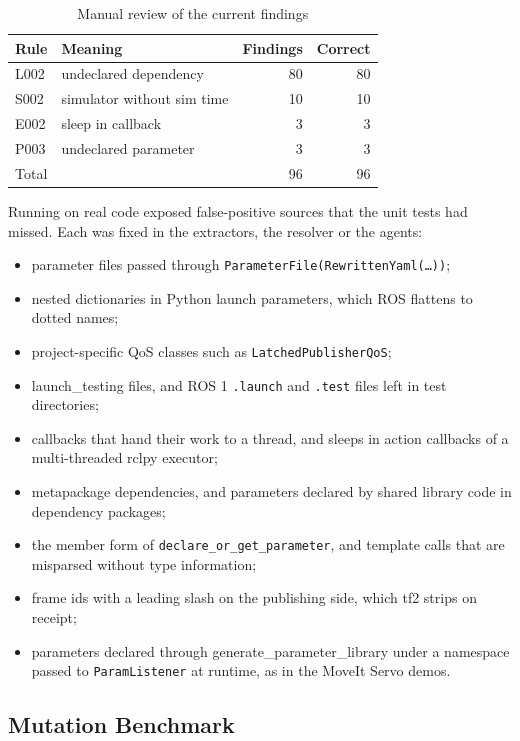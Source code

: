 \documentclass[conference]{IEEEtran}
\newcommand{\code}[1]{\texttt{#1}}
\begin{document}
\begin{table}[t]
\centering
\caption{Manual review of the current findings}
\label{tab:precision}
\footnotesize
\begin{tabular}{@{}llrr@{}}
\toprule
Rule & Meaning & Findings & Correct\\
\midrule
L002 & undeclared dependency       & 80 & 80\\
S002 & simulator without sim time  & 10 & 10\\
E002 & sleep in callback           &  3 &  3\\
P003 & undeclared parameter        &  3 &  3\\
\midrule
Total &                            & 96 & 96\\
\bottomrule
\end{tabular}
\end{table}

Running on real code exposed false-positive sources that the unit tests had missed. Each was
fixed in the extractors, the resolver or the agents:
\begin{itemize}
\item parameter files passed through \code{ParameterFile(RewrittenYaml(\dots))};
\item nested dictionaries in Python launch parameters, which ROS flattens to dotted names;
\item project-specific QoS classes such as \code{LatchedPublisherQoS};
\item launch\_testing files, and ROS 1 \code{.launch} and \code{.test} files left in test
  directories;
\item callbacks that hand their work to a thread, and sleeps in action callbacks of a
  multi-threaded rclpy executor;
\item metapackage dependencies, and parameters declared by shared library code in dependency
  packages;
\item the member form of \code{declare\_or\_get\_parameter}, and template calls that are
  misparsed without type information;
\item frame ids with a leading slash on the publishing side, which tf2 strips on receipt;
\item parameters declared through generate\_parameter\_library under a namespace passed to
  \code{ParamListener} at runtime, as in the MoveIt Servo demos.
\end{itemize}

\subsection{Mutation Benchmark}
\label{sec:mutation}
\end{document}
